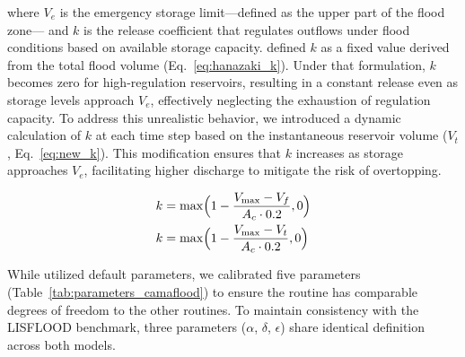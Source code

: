 \documentclass[hess, manuscript]{copernicus}
\begin{document}
where $V_e$ is the emergency storage limit—defined as the upper part of the flood zone— and $k$ is the release coefficient that regulates outflows under flood conditions based on available storage capacity. \citet{Hanazaki2022} defined $k$ as a fixed value derived from the total flood volume (Eq.~\ref{eq:hanazaki_k}). Under that formulation, $k$ becomes zero for high-regulation reservoirs, resulting in a constant release even as storage levels approach $V_e$, effectively neglecting the exhaustion of regulation capacity. To address this unrealistic behavior, we introduced a dynamic calculation of $k$ at each time step based on the instantaneous reservoir volume ($V_t$, Eq.~\ref{eq:new_k}). This modification ensures that $k$ increases as storage approaches $V_e$, facilitating higher discharge to mitigate the risk of overtopping.

\begin{subequations}
    \label{eq:camaflood_release_coefficient}
    \begin{align}
        k &= \max \Bigl( 1 - \frac{V_{\max} - V_f}{A_{c} \cdot 0.2}, 0 \Bigr) \label{eq:hanazaki_k}\\
        k &= \max \Bigl( 1 - \frac{V_{\max} - V_t}{A_{c} \cdot 0.2}, 0 \Bigr) \label{eq:new_k}
    \end{align}
\end{subequations}

While \citet{Hanazaki2022} utilized default parameters, we calibrated five parameters (Table~\ref{tab:parameters_camaflood}) to ensure the routine has comparable degrees of freedom to the other routines. To maintain consistency with the LISFLOOD benchmark, three parameters ($\alpha$, $\delta$, $\epsilon$) share identical definition across both models.
\end{document}
